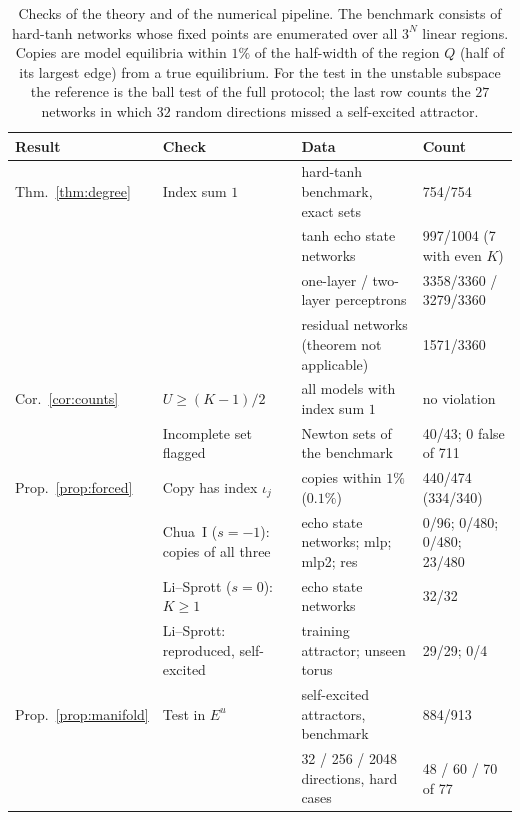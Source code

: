 \begin{table}
\caption{Checks of the theory and of the numerical pipeline. The benchmark consists of hard-tanh networks whose fixed
points are enumerated over all $3^N$ linear regions. Copies are model equilibria within $1\%$ of the half-width of the
region $Q$ (half of its largest edge) from a true equilibrium. For the test in the unstable subspace the reference is the ball test of the full protocol;
the last row counts the $27$ networks in which $32$ random directions missed a self-excited attractor.}
\label{tab:theory}
\begin{ruledtabular}
\begin{tabular}{llll}
Result & Check & Data & Count \\
\hline
Thm.~\ref{thm:degree} & Index sum $1$ & hard-tanh benchmark, exact sets & 754/754 \\
 &  & tanh echo state networks & 997/1004 (7 with even $K$) \\
 &  & one-layer / two-layer perceptrons & 3358/3360 / 3279/3360 \\
 &  & residual networks (theorem not applicable) & 1571/3360 \\
Cor.~\ref{cor:counts} & $U\ge(K-1)/2$ & all models with index sum $1$ & no violation \\
 & Incomplete set flagged & Newton sets of the benchmark & 40/43; 0 false of 711 \\
Prop.~\ref{prop:forced} & Copy has index $\iota_j$ & copies within $1\%$ ($0.1\%$) & 440/474 (334/340) \\
 & Chua~I ($s=-1$): copies of all three & echo state networks; mlp; mlp2; res & 0/96; 0/480; 0/480; 23/480 \\
 & Li--Sprott ($s=0$): $K\ge1$ & echo state networks & 32/32 \\
 & Li--Sprott: reproduced, self-excited & training attractor; unseen torus & 29/29; 0/4 \\
Prop.~\ref{prop:manifold} & Test in $E^u$ & self-excited attractors, benchmark & 884/913 \\
 &  & 32 / 256 / 2048 directions, hard cases & 48 / 60 / 70 of 77 \\
\end{tabular}
\end{ruledtabular}
\end{table}
